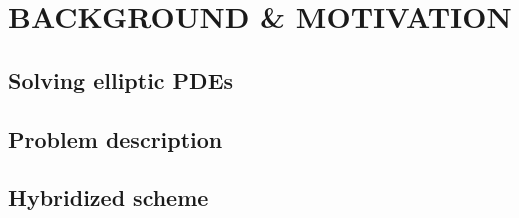 %
%
%
\section{\large BACKGROUND \& MOTIVATION}


%
%
%
\subsection{Solving elliptic PDEs}


%
%
%
\subsection{Problem description}


%
%
%
\subsection{Hybridized scheme}

